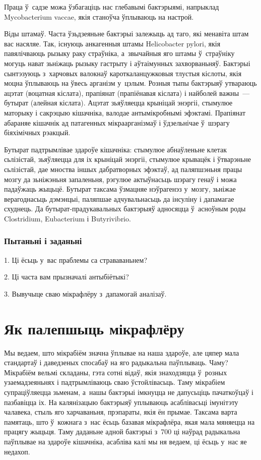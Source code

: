 Праца ў~садзе можа ўзбагаціць нас глебавымі бактэрыямі, напрыклад Mycobacterium vaccae, якія станоўча ўплываюць на настрой.

Віды штамаў. Часта ўзьдзеяньне бактэрыі залежыць ад таго, які менавіта штам вас насяляе. Так, існуюць анкагенныя штамы Helicobacter pylori, якія павялічваюць рызыку раку страўніка, а~звычайныя яго штамы ў~страўніку могуць нават зьніжаць рызыку гастрыту і аўтаімунных захворваньняў. Бактэрыі сынтэзуюць з~харчовых валокнаў кароткаланцужковыя тлустыя кіслоты, якія моцна ўплываюць на ўвесь арганізм у~цэлым. Розныя тыпы бактэрыяў утвараюць ацэтат (воцатная кіслата), прапіянат (прапіёнавая кіслата) і найболей важны~--- бутырат (алейная кіслата). Ацэтат зьяўляецца крыніцай энэргіі, стымулюе маторыку і сакрэцыю кішачніка, валодае антымікробнымі эфэктамі. Прапіянат абараняе кішачнік ад патагенных мікраарганізмаў і ўдзельнічае ў~шэрагу біяхімічных рэакцый.

Бутырат падтрымлівае здароўе кішачніка: стымулюе абнаўленьне клетак сьлізістай, зьяўляецца для іх крыніцай энэргіі, стымулюе крывацёк і ўтварэньне сьлізістай, дае мноства іншых дабратворных эфэктаў, ад паляпшэньня працы мозгу да зьніжэньня запаленьня, рэгулюе актыўнасьць шэрагу генаў і можа падаўжаць жыцьцё. Бутырат таксама ўзмацняе нэўрагенэз у~мозгу, зьніжае верагоднасьць дэмэнцыі, паляпшае адчувальнасьць да інсуліну і дапамагае схуднець. Да бутырат-прадукавальных бактэрыяў адносяцца ў~асноўным роды Clostridium, Eubacterium і Butyrivibrio.

\subsubsection{Пытаньні і заданьні}

1. Ці ёсьць у~вас праблемы са страваваньнем?

2. Ці часта вам прызначалі антыбіётыкі?

3. Вывучыце сваю мікрафлёру з~дапамогай аналізаў.


\section{Як палепшыць мікрафлёру}

Мы ведаем, што мікрабіём значна ўплывае на наша здароўе, але цяпер мала стандартаў і даведзеных спосабаў на яго радыкальна паўплываць. Чаму? Мікрабіём вельмі складаны, гэта сотні відаў, якія знаходзяцца ў~розных узаемадзеяньнях і падтрымліваюць сваю ўстойлівасьць. Таму мікрабіем супраціўляецца зьменам, а~нашы бактэрыі імкнуцца не дапусьціць пачаткоўцаў і пазбавіцца іх. На калянізацыю бактэрыяў уплываюць асаблівасьці імунітэту чалавека, стыль яго харчаваньня, прэпараты, якія ён прымае. Таксама варта памятаць, што ў~кожнага з~нас ёсьць базавая мікрафлёра, якая мала мяняецца на працягу жыцьця. Таму даданьне адной бактэрыі з~700 ці наўрад радыкальна паўплывае на здароўе кішачніка, асабліва калі мы ня ведаем, ці ёсьць у~нас яе недахоп.

